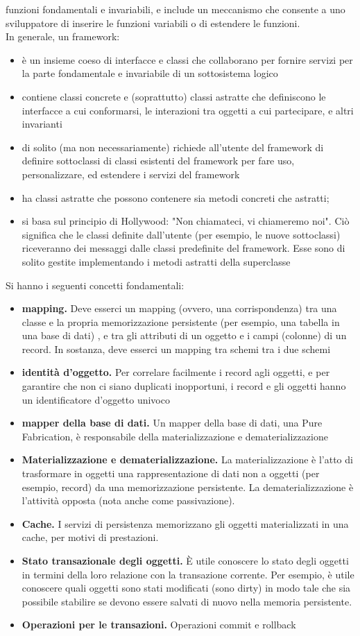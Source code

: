 \documentclass[a4paper,12pt, oneside]{book}
\begin{document}
funzioni fondamentali e invariabili, e include un meccanismo che consente a uno sviluppatore di inserire le funzioni variabili o di estendere le funzioni.\\
In generale, un framework:
\begin{itemize}
\item è un insieme coeso di interfacce e classi che collaborano per fornire servizi per la
parte fondamentale e invariabile di un sottosistema logico
\item contiene classi concrete e (soprattutto) classi astratte che definiscono le interfacce a
cui conformarsi, le interazioni tra oggetti a cui partecipare, e altri invarianti
\item di solito (ma non necessariamente) richiede all'utente del framework di definire
sottoclassi di classi esistenti del framework per fare uso, personalizzare, ed estendere
i servizi del framework
\item ha classi astratte che possono contenere sia metodi concreti che astratti;
\item si basa sul principio di Hollywood: "Non chiamateci, vi chiameremo noi". Ciò
significa che le classi definite dall'utente (per esempio, le nuove sottoclassi) riceveranno dei messaggi dalle classi predefinite del framework. Esse sono di solito gestite
implementando i metodi astratti della superclasse
\end{itemize} Si hanno i seguenti concetti fondamentali:
\begin{itemize}
\item \textbf{mapping. }Deve esserci un mapping (ovvero, una corrispondenza) tra una classe
e la propria memorizzazione persistente (per esempio, una tabella in una base di
dati) , e tra gli attributi di un oggetto e i campi (colonne) di un record. In sostanza,
deve esserci un mapping tra schemi tra i due schemi
\item\textbf{ identità d'oggetto.} Per correlare facilmente i record agli oggetti, e per garantire che
non ci siano duplicati inopportuni, i record e gli oggetti hanno un identificatore
d'oggetto univoco
\item \textbf{mapper della base di dati. }Un mapper della base di dati, una Pure Fabrication, è
responsabile della materializzazione e dematerializzazione
\item \textbf{Materializzazione e dematerializzazione. }La materializzazione è l'atto di trasformare in oggetti una rappresentazione di dati non a oggetti (per esempio, record) da
una memorizzazione persistente. La dematerializzazione è l'attività opposta (nota
anche come passivazione).
\item \textbf{Cache.} I servizi di persistenza memorizzano gli oggetti materializzati in una cache, per motivi di prestazioni.
\item \textbf{Stato transazionale degli oggetti.} È utile conoscere lo stato degli oggetti in termini della loro relazione con la transazione corrente. Per esempio, è utile conoscere
quali oggetti sono stati modificati (sono dirty) in modo tale che sia possibile stabilire se devono essere salvati di nuovo nella memoria persistente.
\item  \textbf{Operazioni per le transazioni.} Operazioni commit e rollback
\end{itemize}
\end{document}
